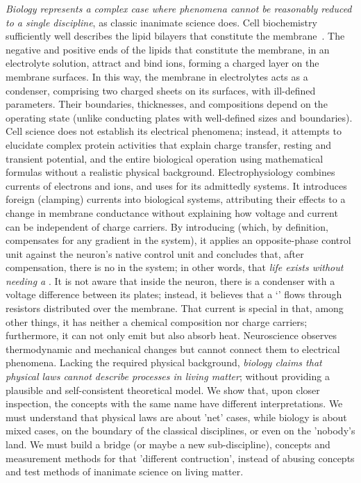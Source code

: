 \textit{Biology represents a complex case where phenomena cannot be reasonably reduced to a single discipline},
as classic inanimate science does.
Cell biochemistry sufficiently well describes the lipid bilayers that constitute the membrane~\cite{OriginOfLifeMicelles:2021,ReproductionLife:2023}.
The negative and positive ends of the lipids that constitute the membrane, in an electrolyte solution,
attract and bind ions, forming a charged layer on the membrane surfaces.
In this way, the membrane in electrolytes acts as a condenser, comprising two charged sheets on its surfaces,
with ill-defined parameters. Their boundaries, thicknesses, and compositions depend on the operating state
(unlike conducting plates with well-defined sizes and boundaries).
Cell science does not establish its electrical phenomena; instead, it attempts to elucidate complex protein activities
 that explain charge transfer, resting and transient potential, and the entire biological operation using mathematical formulas without a realistic physical background.
Electrophysiology combines currents of electrons and ions, and uses  for its admittedly  systems.
It introduces foreign (clamping) currents into biological systems, attributing their effects to a change in membrane conductance without explaining how voltage and current can be independent of charge carriers.
By introducing  (which, by definition, compensates for any gradient in the system), it applies an opposite-phase control unit against the neuron’s native control unit and concludes that, after compensation, there is no  in the system; in other words, that \textit{life exists without needing a }.
It is not aware that inside the neuron, there is a condenser with a voltage difference between its plates; instead, it believes that a ‘’ flows through resistors distributed over the membrane.
That current is special in that, among other things, it has neither a chemical composition nor charge carriers; furthermore, it can not only emit but also absorb heat. 
Neuroscience observes thermodynamic and mechanical changes but cannot connect them to electrical phenomena.
Lacking the required physical background, \textit{biology claims that physical laws cannot describe processes in living matter}; without providing a plausible and self-consistent theoretical model.
We show that, upon closer inspection, the concepts with the same name have different interpretations.
We must understand that physical laws are about 'net' cases,
while biology is about mixed cases, on the boundary of the classical disciplines, or even on the 'nobody's land.
We must build a bridge (or maybe a new sub-discipline),
concepts and measurement methods for that 'different contruction', instead of abusing concepts and test methods
of inanimate science on living matter. 


